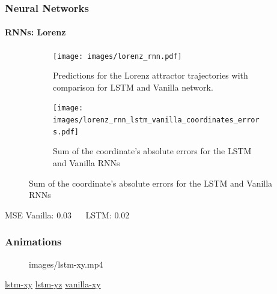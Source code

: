 \documentclass{beamer}
\begin{document}
\begin{frame}[t]
	\frametitle{Neural Networks}
	\framesubtitle{RNNs: Lorenz}
	\begin{figure}[ht]
		\centering
		\begin{subfigure}[b]{0.5\textwidth}
		\begin{center}
			\texttt{[image: images/lorenz\_rnn.pdf]}
		\end{center}
		\caption{Predictions for the Lorenz attractor trajectories with comparison for LSTM and Vanilla network.}
		\end{subfigure}
		\begin{subfigure}[b]{0.45\textwidth}
		      \centering
		      \texttt{[image: images/lorenz\_rnn\_lstm\_vanilla\_coordinates\_errors.pdf]}
		      \caption{Sum of the coordinate’s absolute errors for
the LSTM and Vanilla RNNs}
		      \label{fig:mae-rnn}
	    \end{subfigure}

		\label{fig:rnn}
	\end{figure}
	\begin{block}{MSE}
	Vanilla: 0.03	 $\quad$ LSTM: 0.02
	\end{block}

\end{frame}

\begin{frame}[t]
	\frametitle{Animations}	
	\begin{figure}[ht]
		\centering
  {images/lstm-xy.mp4}
	\end{figure}

	\begin{center}
		\href{file:images/lstm-xy.mp4}{lstm-xy}
		\hfill
		\href{file:images/lstm-yz.mp4}{lstm-yz}
		\hfill
		\href{file:images/vanilla-xy.mp4}{vanilla-xy}
	\end{center}
\end{frame}
\end{document}
